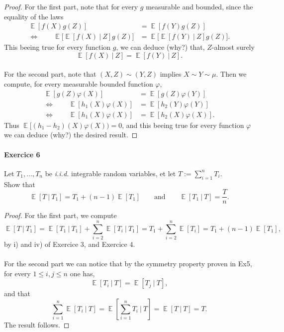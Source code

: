 \documentclass[10pt,a4paper]{article}
\theoremstyle{definition}
\numberwithin{equation}{section}
\DeclareMathOperator{\E}{\mathbb{E}}
\begin{document}
\begin{proof}
For the first part, note that for every $g$ measurable and bounded, since the equality of the laws
\begin{align*}
\E[f(X)g(Z)]&=\E[f(Y)g(Z)]\\
\Leftrightarrow \qquad \E\big[\E[f(X)~|~Z]g(Z)\big]&=\E\big[\E[f(Y)~|~Z]g(Z)\big].
\end{align*}
This beeing true for every function $g$, we can deduce (why?) that, $Z$-almost surely
$$\E[f(X)~|~Z] = \E[f(Y)~|~Z].$$
~\\
For the second part, note that $(X,Z)\sim (Y,Z)$ implies $X\sim Y\sim\mu$. Then we compute, for every measurable bounded function $\varphi$,
\begin{align*}
\E[g(Z)\varphi(X)]&=\E[g(Z)\varphi(Y)]\\
\Leftrightarrow \qquad \E[h_1(X)\varphi(X)]&=\E[h_2(Y)\varphi(Y)]\\
\Leftrightarrow \qquad \E[h_1(X)\varphi(X)]&=\E[h_2(X)\varphi(X)].
\end{align*}
Thus $\E[(h_1-h_2)(X)\varphi(X))=0$, and this beeing true for every function $\varphi$ we can deduce (why?) the desired result.
\end{proof}


\paragraph{Exercice 6}
Let $T_1,\dots,T_n$ be \textit{i.i.d.} integrable random variables, et let $T:=\sum_{i=1}^n T_i$.\\
Show that
$$\E[T~|~T_1] = T_1 + (n-1)\E[T_1] \qquad \text{and}\qquad \E[T_1~|~T]=\dfrac{T}{n}.$$

\begin{proof}
For the first part, we compute
$$\E[T~|~T_1]=\E[T_1~|~T_1] + \sum_{i=2}^n\E[T_i~|~T_1]=T_1+ \sum_{i=2}^n \E[T_i] = T_1+ (n-1)\E[T_1],$$
by i) and iv) of Exercice 3, and Exercice 4.\\
~\\
For the second part we can notice that by the symmetry property proven in Ex5, for every $1\leq i,j \leq n$ one has,
$$\E[T_i~|~T]=\E[T_j~|~T],$$
and that 
$$\sum_{i=1}^n \E[T_i~|~T] = \E[\sum_{i=1}^n T_i~|~T]=\E[T~|~T]=T.$$
The result follows.
\end{proof}
\end{document}
